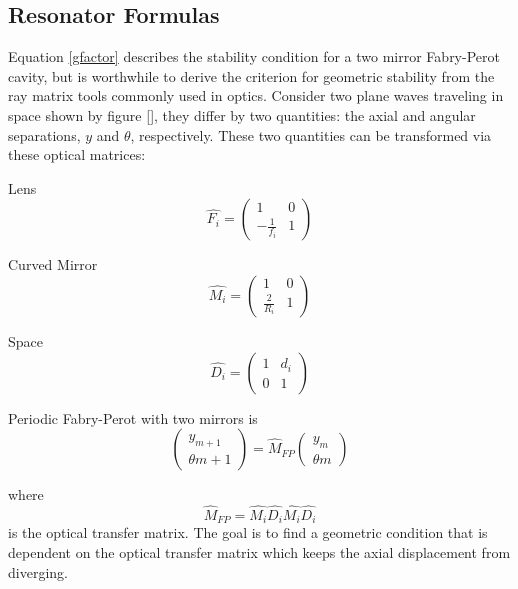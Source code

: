 \begin{appendices}

	\chapter{Resonator Formulas} \label{FPappendix}
	Equation \ref{gfactor} describes the stability condition for a two mirror Fabry-Perot cavity, but is worthwhile to derive the criterion for geometric stability from the ray matrix tools commonly used in optics. Consider two plane waves traveling in space shown by figure [], they differ by two quantities: the axial and angular separations,  $y$ and $\theta$, respectively.  These two quantities can be transformed via these optical matrices:
	
	Lens
	\begin{equation} \label{lens}
	\hat{F_i} = 
	\begin{pmatrix}
		1				&0			
	\\ 	-\frac{1}{f_i}	&1
	\end{pmatrix}
	\end{equation}
	
	Curved Mirror
	\begin{equation} \label{mirror}
	\hat{M_i} = 
	\begin{pmatrix}
		1				&0			
	\\ 	\frac{2}{R_i}	&1
	\end{pmatrix}
	\end{equation}
	
	Space
	\begin{equation} \label{space}
	\hat{D_i} = 
	\begin{pmatrix}
		1	& d_i		
	\\ 	0	&1
	\end{pmatrix}
	\end{equation}
	
	
	Periodic Fabry-Perot with two mirrors is 
	\begin{equation}
	\begin{pmatrix} y_{m+1} 
	\\ \theta{m+1}
	\end{pmatrix}
	= \hat{M}_{FP} \begin{pmatrix} y_{m} 
	\\ \theta{m}
	\end{pmatrix}
	\end{equation}

	where 
	\begin{equation}
	\hat{M}_{FP} = \hat{M_i} \hat{D_i} \hat{M_i} \hat{D_i}
	\end{equation}
	is the optical transfer matrix.
	The goal is to find a geometric condition that is dependent on the optical transfer matrix which keeps the axial displacement from diverging.
	

\end{appendices}
